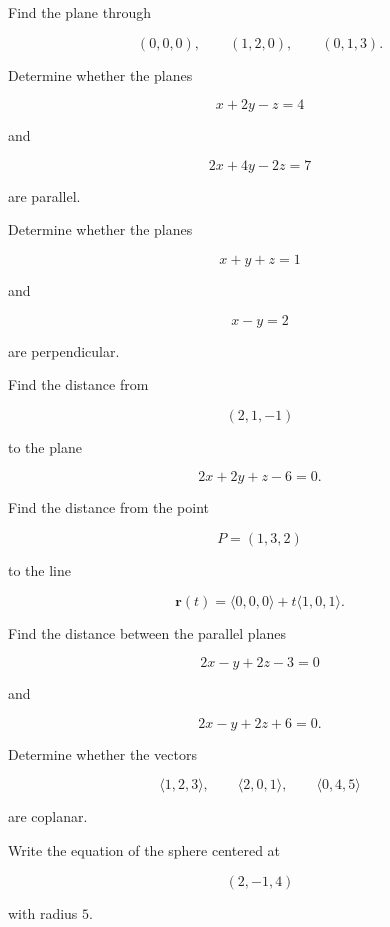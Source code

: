 \begin{exercise}[3]
Find the plane through

\[ (0,0,0),\qquad(1,2,0),\qquad(0,1,3). \]
\end{exercise}

\begin{exercise}[2]
Determine whether the planes

\[ x+2y-z=4 \]

and

\[ 2x+4y-2z=7 \]

are parallel.
\end{exercise}

\begin{exercise}[2]
Determine whether the planes

\[ x+y+z=1 \]

and

\[ x-y=2 \]

are perpendicular.
\end{exercise}

\begin{exercise}[2]
Find the distance from

\[ (2,1,-1) \]

to the plane

\[ 2x+2y+z-6=0. \]
\end{exercise}

\begin{exercise}[3]
Find the distance from the point

\[ P=(1,3,2) \]

to the line

\[ \mathbf{r}(t)=\langle0,0,0\rangle+t\langle1,0,1\rangle. \]
\end{exercise}

\begin{exercise}[3]
Find the distance between the parallel planes

\[ 2x-y+2z-3=0 \]

and

\[ 2x-y+2z+6=0. \]
\end{exercise}

\begin{exercise}[3]
Determine whether the vectors

\[
\langle1,2,3\rangle,\qquad
\langle2,0,1\rangle,\qquad
\langle0,4,5\rangle
\]

are coplanar.
\end{exercise}

\begin{exercise}[2]
Write the equation of the sphere centered at

\[ (2,-1,4) \]

with radius \(5\).
\end{exercise}


